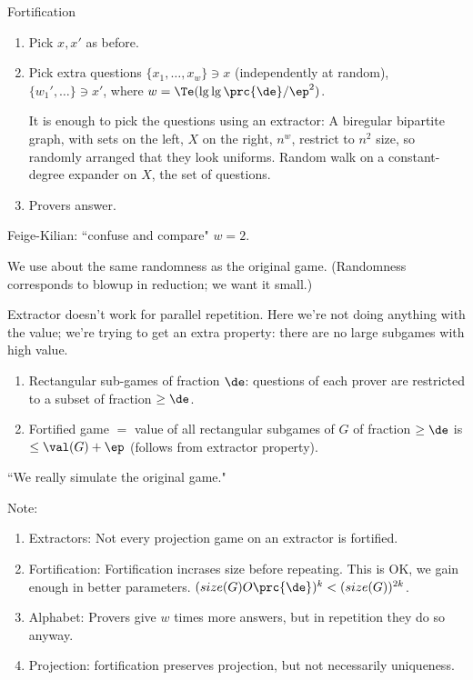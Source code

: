 Fortification
\begin{enumerate}
\item
Pick $x,x'$ as before.
\item 
Pick extra questions $\{x_1,\ldots, x_w\}\ni x$ (independently at random), $\{w_1',\ldots\}\ni x'$, where $w=\Te(\lg\lg\prc{\de}/\ep^2)$.

It is enough to pick the questions using an extractor: A biregular 
bipartite graph, with sets on the left, $X$ on the right,  
$n^w$, restrict to $n^2$ size, so randomly arranged that they look uniforms.
Random walk on a constant-degree expander on $X$, the set of questions. %
\item Provers answer.
\end{enumerate}
Feige-Kilian: ``confuse and compare" $w=2$. %

We use about the same randomness as the original game. (Randomness corresponds to blowup in reduction; we want it small.)

Extractor doesn't work for parallel repetition. Here we're not doing anything with the value; we're trying to get an extra property: there are no large subgames with high value.
\begin{enumerate}
\item
Rectangular sub-games of fraction $\de$: questions of each prover are restricted to a subset of fraction $\ge \de$.
\item
Fortified game $=$ value of all rectangular subgames of $G$ of fraction $\ge \de$ is $\le \val(G)+\ep$ (follows from extractor property).
\end{enumerate}
``We really simulate the original game."

Note:
\begin{enumerate}
\item
Extractors: Not every projection game on an extractor is fortified.
\item
Fortification: Fortification incrases size before repeating. This is OK, we gain enough in better parameters. $(size(G)O\prc{\de})^k<(size(G))^{2k}$. 
\item
Alphabet: Provers give $w$ times more answers, but in repetition they do so anyway.
\item Projection: fortification preserves projection, but not necessarily uniqueness.
\end{enumerate}

